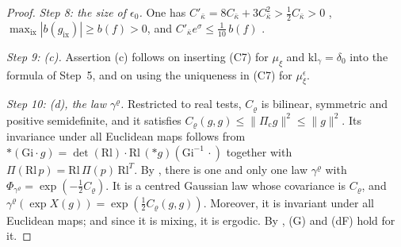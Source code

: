\documentclass[11pt]{amsart}
\theoremstyle{definition}
\begin{document}
\begin{proof}
\emph{Step 8: the size of $\epsilon_0$.}
One has $C'_{\bar\kappa}=\allowbreak 8C_{\bar\kappa}+3C_{\bar\kappa}^2>\frac12C_{\bar\kappa}>0$ \cite[Proposition~43.2, Constants]{QEDIII}, $\max_{\mathrm{ix}}|b(g_{\mathrm{ix}})|\ge b(f)>0$, and $C'_{\bar\kappa}e^\sigma\le\frac1{10}\,b(f)$ \cite[Chapter~44, (0.3)]{QEDIII}.

\emph{Step 9: (c).}
Assertion (c) follows on inserting (C7) for $\mu_\xi$ and $\mathrm{kl}_\gamma=\delta_0$ \cite[Theorem~14.26\,(c)]{QEDII} into the formula of Step~5, and on using the uniqueness in (C7) for $\mu_\xi^\epsilon$.

\emph{Step 10: (d), the law $\gamma^\varrho$.}
Restricted to real tests, $C_\varrho$ is bilinear, symmetric and positive semidefinite, and it satisfies $C_\varrho(g,g)\le\|\Pi_{\mathrm c}g\|^2\le\|g\|^2$.
Its invariance under all Euclidean maps follows from $\ast(\mathrm{Gi}\cdot g)=\allowbreak \det(\mathrm{Rl})\cdot\mathrm{Rl}\,\allowbreak (\ast g)(\mathrm{Gi}^{-1}\,\allowbreak \cdot)$ \cite[Lemma~9.12]{QEDI} together with $\Pi(\mathrm{Rl}\,p)=\mathrm{Rl}\,\Pi(p)\,\mathrm{Rl}^T$.
By \cite[Lemma~9.11\,(a)--(c)]{QEDI}, there is one and only one law $\gamma^\varrho$ with $\Phi_{\gamma^\varrho}=\exp(-\frac12C_\varrho)$.
It is a centred Gaussian law whose covariance is $C_\varrho$, and $\gamma^\varrho(\exp X(g))=\exp(\frac12C_\varrho(g,g))$.
Moreover, it is invariant under all Euclidean maps; and since it is mixing, it is ergodic.
By \cite[Remark~14.4]{QEDII}, (G) and (dF) hold for it.


\end{proof}
\end{document}
